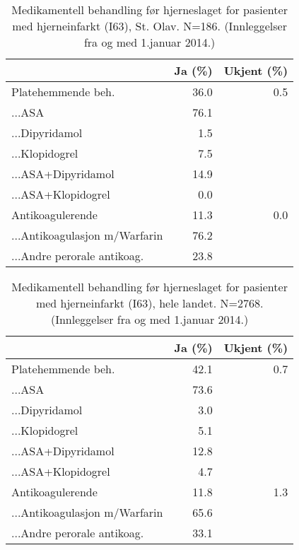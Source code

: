 \documentclass [norsk,a4paper,twoside]{article}\usepackage[]{graphicx}\usepackage[]{color}
\begin{document}
\begin{table}[ht]
\centering
\begin{tabular}{lrr}
  \hline
 & Ja (\%) & Ukjent (\%) \\ 
  \hline
Platehemmende beh. & 36.0 & 0.5 \\ 
  ...ASA & 76.1 &  \\ 
  ...Dipyridamol & 1.5 &  \\ 
  ...Klopidogrel & 7.5 &  \\ 
  ...ASA+Dipyridamol & 14.9 &  \\ 
  ...ASA+Klopidogrel & 0.0 &  \\ 
  Antikoagulerende & 11.3 & 0.0 \\ 
  ...Antikoagulasjon m/Warfarin & 76.2 &  \\ 
  ...Andre perorale antikoag. & 23.8 &  \\ 
   \hline
\end{tabular}
\caption{Medikamentell behandling før hjerneslaget for pasienter med hjerneinfarkt (I63), St. Olav. N=186. (Innleggelser fra og med 1.januar 2014.)} 
\label{tab:MedBehPre1Diag2}
\end{table}
\begin{table}[ht]
\centering
\begin{tabular}{lrr}
  \hline
 & Ja (\%) & Ukjent (\%) \\ 
  \hline
Platehemmende beh. & 42.1 & 0.7 \\ 
  ...ASA & 73.6 &  \\ 
  ...Dipyridamol & 3.0 &  \\ 
  ...Klopidogrel & 5.1 &  \\ 
  ...ASA+Dipyridamol & 12.8 &  \\ 
  ...ASA+Klopidogrel & 4.7 &  \\ 
  Antikoagulerende & 11.8 & 1.3 \\ 
  ...Antikoagulasjon m/Warfarin & 65.6 &  \\ 
  ...Andre perorale antikoag. & 33.1 &  \\ 
   \hline
\end{tabular}
\caption{Medikamentell behandling før hjerneslaget for pasienter med hjerneinfarkt (I63), hele landet. N=2768. (Innleggelser fra og med 1.januar 2014.)} 
\label{tab:MedBehPre2Diag2}
\end{table}
\end{document}
